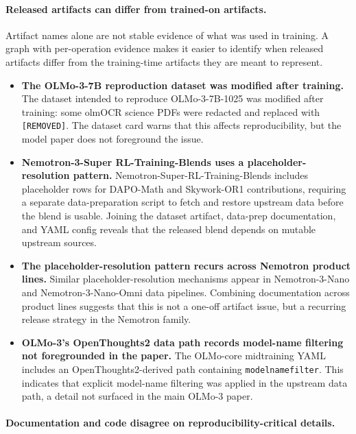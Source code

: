 \paragraph{Released artifacts can differ from trained-on artifacts.}

Artifact names alone are not stable evidence of what was used in training. A graph with per-operation evidence makes it easier to identify when released artifacts differ from the training-time artifacts they are meant to represent.

\begin{itemize}
    \item \textbf{The OLMo-3-7B reproduction dataset was modified after training.}
    The dataset intended to reproduce OLMo-3-7B-1025 was modified after training: some olmOCR science PDFs were redacted and replaced with \texttt{[REMOVED]}. The dataset card warns that this affects reproducibility, but the model paper does not foreground the issue.

    \item \textbf{Nemotron-3-Super RL-Training-Blends uses a placeholder-resolution pattern.}
    Nemotron-Super-RL-Training-Blends includes placeholder rows for DAPO-Math and Skywork-OR1 contributions, requiring a separate data-preparation script to fetch and restore upstream data before the blend is usable. Joining the dataset artifact, data-prep documentation, and YAML config reveals that the released blend depends on mutable upstream sources.

    \item \textbf{The placeholder-resolution pattern recurs across Nemotron product lines.}
    Similar placeholder-resolution mechanisms appear in Nemotron-3-Nano and Nemotron-3-Nano-Omni data pipelines. Combining documentation across product lines suggests that this is not a one-off artifact issue, but a recurring release strategy in the Nemotron family.

    \item \textbf{OLMo-3's OpenThoughts2 data path records model-name filtering not foregrounded in the paper.}
    The OLMo-core midtraining YAML includes an OpenThoughts2-derived path containing \texttt{modelnamefilter}. This indicates that explicit model-name filtering was applied in the upstream data path, a detail not surfaced in the main OLMo-3 paper.
\end{itemize}

\paragraph{Documentation and code disagree on reproducibility-critical details.}

